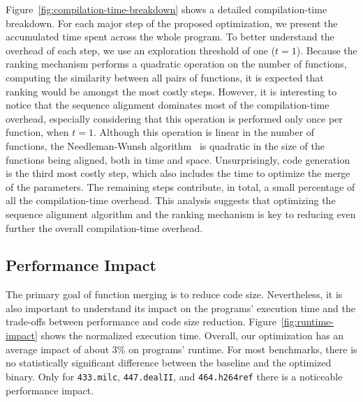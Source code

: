 Figure~\ref{fig:compilation-time-breakdown} shows a detailed compilation-time breakdown. For each major step of the proposed optimization,
we present the accumulated time spent across the whole program. To better understand the overhead of each step, we use an exploration threshold of one ($t = 1$). Because the ranking mechanism performs a quadratic operation on the number of functions, computing
the similarity between all pairs of functions, it is expected that ranking would be amongst the most costly steps. However, it is
interesting to notice that the sequence alignment dominates most of the compilation-time overhead, especially considering that this
operation is performed only once per function, when $t = 1$. Although this operation is linear in the number of functions, the
Needleman-Wunsh algorithm~\cite{needleman70} is quadratic in the size of the functions being aligned, both in time and space.
Unsurprisingly, code generation is the third most costly step, which also includes the time to optimize the merge of the parameters. The
remaining steps contribute, in total, a small percentage of all the compilation-time overhead. This analysis suggests that optimizing the
sequence alignment algorithm and the ranking mechanism is key to reducing even further the overall compilation-time overhead.

\subsection{Performance Impact}


The primary goal of function merging is to reduce code size. Nevertheless, it is also important to understand its impact on the programs'
execution time and the trade-offs between performance and code size reduction. Figure~\ref{fig:runtime-impact} shows the normalized
execution time. Overall, our optimization has an average impact of about 3\% on programs' runtime. For most benchmarks, there is no
statistically significant difference between the baseline and the optimized binary. Only for \texttt{433.milc}, \texttt{447.dealII}, and
\texttt{464.h264ref} there is a noticeable performance impact.




